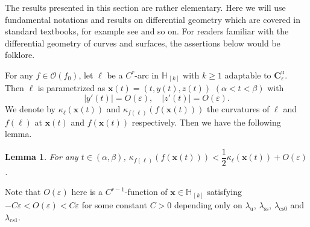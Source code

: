 \documentclass{amsart}
\newtheorem{lem}[thm]{Lemma}
\theoremstyle{definition}
\numberwithin{equation}{section}
\numberwithin{figure}{section}
\begin{document}
The results presented in this section are rather elementary.
Here we will use fundamental notations and results on differential geometry which are covered in standard textbooks, 
for example see \cite{dC76, Ko21} and so on.
For readers familiar with the differential geometry of curves and surfaces, the assertions below would 
be folklore.


For any $f\in \mathcal{O}(f_0)$, 
let $\ell$ be a $C^r$-arc in $\mathbb{H}_{\,[k]}$ with $k\geq 1$ adaptable to $\boldsymbol{C}_\varepsilon^{\mathrm{u}}$.
Then $\ell$ is parametrized as $\boldsymbol{x}(t)=(t,y(t),z(t))$ $(\alpha<t<\beta)$ with
\begin{equation}\label{eqn_y'}
|y'(t)|=O(\varepsilon),\quad |z'(t)|=O(\varepsilon).
\end{equation}
We denote by $\kappa_\ell(\boldsymbol{x}(t))$ and $\kappa_{f(\ell)}(f(\boldsymbol{x}(t)))$ the curvatures of $\ell$ and 
$f(\ell)$ at $\boldsymbol{x}(t)$ and $f(\boldsymbol{x}(t))$ respectively.
Then we have the following lemma.



\begin{lem}\label{l_l_curvature}
For any $t\in (\alpha,\beta)$, $\kappa_{f(\ell)}(f(\boldsymbol{x}(t)))< \dfrac12\kappa_\ell(\boldsymbol{x}(t))+O(\varepsilon)$.
\end{lem}

Note that $O(\varepsilon)$ here is a $C^{r-1}$-function of $\boldsymbol{x}\in \mathbb{H}_{\,[k]}$ satisfying $-C\varepsilon<O(\varepsilon)<C\varepsilon$ for some constant $C>0$ depending only on $\lambda_{\mathrm{u}}$, $\lambda_{\mathrm{ss}}$, 
$\lambda_{\mathrm{cs} 0}$ and $\lambda_{\mathrm{cs} 1}$.
\end{document}
